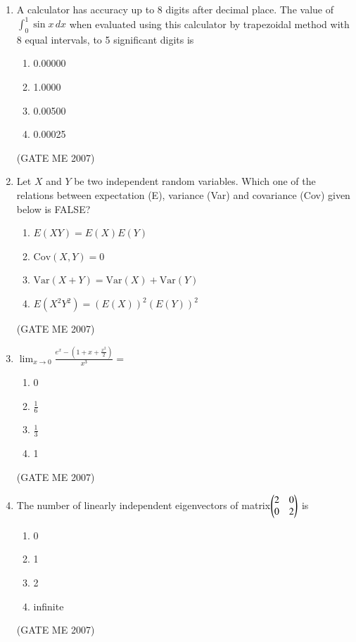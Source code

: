 \documentclass[journal]{IEEEtran}
\begin{document}
\begin{enumerate}
\item A calculator has accuracy up to 8 digits after decimal place. The value of $ \int_0^1 \sin x \, dx $ when evaluated using this calculator by trapezoidal method with 8 equal intervals, to 5 significant digits is
\begin{multicols}{4}
\begin{enumerate}
\item 0.00000
\item 1.0000
\item 0.00500
\item 0.00025
\end{enumerate}
\end{multicols}
\hfill (GATE ME 2007)

\item Let $ X $ and $ Y $ be two independent random variables. Which one of the relations between expectation (E), variance (Var) and covariance (Cov) given below is FALSE?
\begin{multicols}{2}
\begin{enumerate}
\item $ E(XY) = E(X)E(Y) $
\item $ \text{Cov}(X,Y) = 0 $
\item $ \text{Var}(X+Y) = \text{Var}(X) + \text{Var}(Y) $
\item $ E(X^2Y^2) = (E(X))^2(E(Y))^2 $
\end{enumerate}
\end{multicols}
\hfill (GATE ME 2007)

\item $\lim_{x \to 0} \frac{e^x - \left(1 + x + \frac{x^2}{2}\right)}{x^3} =$
\begin{multicols}{4}
\begin{enumerate}
\item 0
\item $ \frac{1}{6} $
\item $ \frac{1}{3} $
\item 1
\end{enumerate}
\end{multicols}
\hfill (GATE ME 2007)

\item The number of linearly independent eigenvectors of matrix$\begin{pmatrix}
2 & 0 \\
0 & 2\end{pmatrix}
$
is
\begin{multicols}{4}
\begin{enumerate}
\item 0
\item 1
\item 2
\item infinite
\end{enumerate}
\end{multicols}
\hfill (GATE ME 2007)


\end{enumerate}
\end{document}
